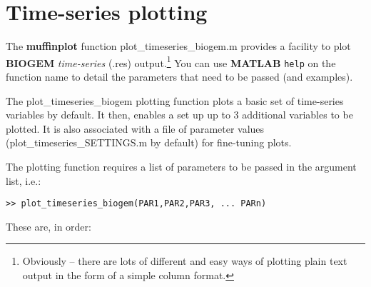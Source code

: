 \documentclass[11pt,fleqn]{book} %
\begin{document}

\newpage 
\section{Time-series plotting}

The \textbf{muffinplot} function \textsf{\footnotesize plot\_timeseries\_biogem.m} provides a facility to plot \textbf{BIOGEM} \textit{time-series} (\textsf{\small .res}) output.\footnote{Obviously -- there are lots of different and easy ways of plotting plain text output in the form of a simple column format.} You can use \textbf{MATLAB} \texttt{help} on the function name to detail the parameters that need to be passed (and examples).

The \textsf{\footnotesize plot\_timeseries\_biogem} plotting function plots a basic set of time-series variables by default. It then, enables a set up up to 3 additional variables to be plotted. It is also associated with a file of parameter values (\textsf{\footnotesize plot\_timeseries\_SETTINGS.m} by default) for fine-tuning plots.

The plotting function requires a list of parameters to be passed in the argument list, i.e.:
\begin{verbatim}
>> plot_timeseries_biogem(PAR1,PAR2,PAR3, ... PARn)
\end{verbatim}

These are, in order:
\end{document}

